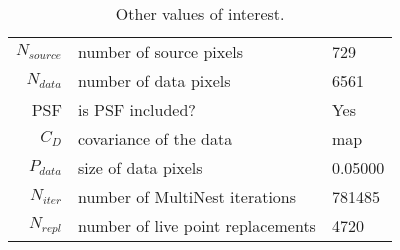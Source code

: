 \begin{table*}[!htb]\caption{Other values of interest.}\begin{center}\begin{tabular}{ r l l }\hline $N_{source}$ & number of source pixels           & 729 \\ 
 $N_{data}$   & number of data pixels             & 6561 \\ 
 PSF & is PSF included?                          & Yes \\
 $C_D$        & covariance of the data            & map \\ 
 $P_{data}$   & size of data pixels               &    0.05000 \\ 
 $N_{iter}$   & number of MultiNest iterations    & 781485 \\ 
 $N_{repl}$   & number of live point replacements & 4720 \\ 
\hline\end{tabular}\end{center}\label{tab:3}\end{table*}